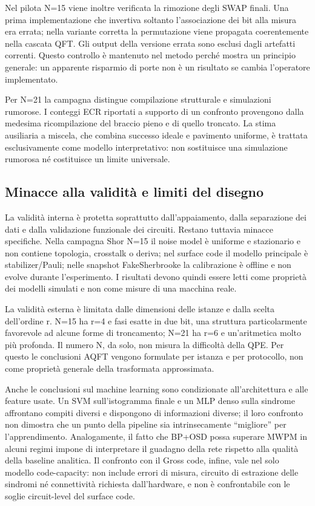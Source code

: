 Nel pilota N=15 viene inoltre verificata la rimozione degli SWAP finali. Una prima implementazione che invertiva soltanto l'associazione dei bit alla misura era errata; nella variante corretta la permutazione viene propagata coerentemente nella cascata QFT. Gli output della versione errata sono esclusi dagli artefatti correnti. Questo controllo è mantenuto nel metodo perché mostra un principio generale: un apparente risparmio di porte non è un risultato se cambia l'operatore implementato.

Per N=21 la campagna distingue compilazione strutturale e simulazioni rumorose. I conteggi ECR riportati a supporto di un confronto provengono dalla medesima ricompilazione del braccio pieno e di quello troncato. La stima ausiliaria a miscela, che combina successo ideale e pavimento uniforme, è trattata esclusivamente come modello interpretativo: non sostituisce una simulazione rumorosa né costituisce un limite universale.

\subsection{Minacce alla validità e limiti del disegno}\label{sec:finale_3_5_7}

La validità interna è protetta soprattutto dall'appaiamento, dalla separazione dei dati e dalla validazione funzionale dei circuiti. Restano tuttavia minacce specifiche. Nella campagna Shor N=15 il noise model è uniforme e stazionario e non contiene topologia, crosstalk o deriva; nel surface code il modello principale è stabilizer/Pauli; nelle snapshot FakeSherbrooke la calibrazione è offline e non evolve durante l'esperimento. I risultati devono quindi essere letti come proprietà dei modelli simulati e non come misure di una macchina reale.

La validità esterna è limitata dalle dimensioni delle istanze e dalla scelta dell'ordine r. N=15 ha r=4 e fasi esatte in due bit, una struttura particolarmente favorevole ad alcune forme di troncamento; N=21 ha r=6 e un'aritmetica molto più profonda. Il numero N, da solo, non misura la difficoltà della QPE. Per questo le conclusioni AQFT vengono formulate per istanza e per protocollo, non come proprietà generale della trasformata approssimata.

Anche le conclusioni sul machine learning sono condizionate all'architettura e alle feature usate. Un SVM sull'istogramma finale e un MLP denso sulla sindrome affrontano compiti diversi e dispongono di informazioni diverse; il loro confronto non dimostra che un punto della pipeline sia intrinsecamente ``migliore'' per l'apprendimento. Analogamente, il fatto che BP+OSD possa superare MWPM in alcuni regimi impone di interpretare il guadagno della rete rispetto alla qualità della baseline analitica. Il confronto con il Gross code, infine, vale nel solo modello code-capacity: non include errori di misura, circuito di estrazione delle sindromi né connettività richiesta dall'hardware, e non è confrontabile con le soglie circuit-level del surface code.

